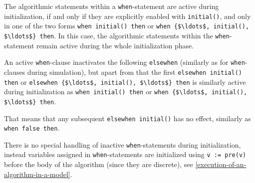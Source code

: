 The algorithmic statements within a \lstinline!when!-statement are active during initialization, if and only if they are explicitly enabled with \lstinline!initial()!, and only in one of the two forms \lstinline!when initial() then! or \lstinline!when {$\ldots$, initial(), $\ldots$} then!.
In this case, the algorithmic statements within the \lstinline!when!-statement remain active during the whole initialization phase.

An active \lstinline!when!-clause inactivates the following \lstinline!elsewhen! (similarly as for \lstinline!when!-clauses during simulation), but apart from that the first \lstinline!elsewhen initial() then! or \lstinline!elsewhen {$\ldots$, initial(), $\ldots$} then! is similarly active during initialization as \lstinline!when initial() then! or \lstinline!when {$\ldots$, initial(), $\ldots$} then!.

\begin{nonnormative}
That means that any subsequent \lstinline!elsewhen initial()! has no effect,
similarly as \lstinline!when false then!.
\end{nonnormative}

\begin{nonnormative}
There is no special handling of inactive \lstinline!when!-statements during initialization, instead variables assigned in \lstinline!when!-statements are initialized using \lstinline!v := pre(v)! before the body of the algorithm (since they are discrete), see \cref{execution-of-an-algorithm-in-a-model}.
\end{nonnormative}

